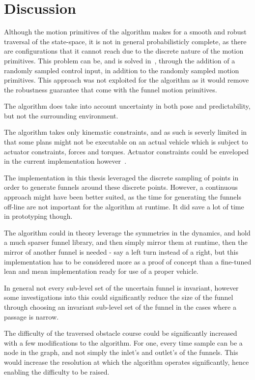 \chapter{Discussion}
\label{chp:discussion}

Although the motion primitives of the \rrtfunnel{} algorithm makes for a smooth
and robust traversal of the state-space, it is not in general probabilisticly
complete, as there are configurations that it cannot reach due to the discrete
nature of the motion primitives. This problem can be, and is solved
in~\cite{vonasekGlobalMotionPlanning2013}, through the addition of a randomly
sampled control input, in addition to the randomly sampled motion primitives.
This approach was not exploited for the \rrtfunnel{} algorithm as it would
remove the robustness guarantee that come with the funnel motion primitives.

The algorithm does take into account uncertainty in both pose and
predictability, but not the surrounding environment.

The algorithm takes only kinematic constraints, and as such is severly limited
in that some plans might not be executable on an actual vehicle which is subject
to actuator constraints, forces and torques. Actuator constraints could be
enveloped in the current implementation
however~\cite{majumdarFunnelLibrariesRealtime2017}.

The implementation in this thesis leveraged the discrete sampling of points in
order to generate funnels around these discrete points. However, a continuous
approach might have been better suited, as the time for generating the funnels
off-line are not important for the algorithm at runtime. It did save a lot of
time in prototyping though.

The algorithm could in theory leverage the symmetries in the dynamics, and hold
a much sparser funnel library, and then simply mirror them at runtime, then the
mirror of another funnel is needed - say a left turn instead of a right, but
this implementation has to be considered more as a proof of concept than a
fine-tuned lean and mean implementation ready for use of a proper vehicle.

In general not every sub-level set of the uncertain funnel is invariant, however
some investigations into this could significantly reduce the size of the funnel
through choosing an invariant sub-level set of the funnel in the cases where a
passage is narrow.

The difficulty of the traversed obstacle course could be significantly increased
with a few modifications to the \rrtfunnel{} algorithm. For one, every time
sample can be a node in the graph, and not simply the inlet's and outlet's of
the funnels. This would increase the resolution at which the algorithm operates
significantly, hence enabling the difficulty to be raised.

